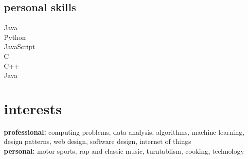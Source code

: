 \documentclass[]{friggeri-cv} %
\begin{document}
    \begin{minipage}[t]{0.5\linewidth}
    \begin{flushright}

    \section{personal skills} 
    \end{flushright}

\hfill
\begin{flushright}
Java\quad{\color{blue} $\varheartsuit\varheartsuit\varheartsuit\varheartsuit\varheartsuit\varheartsuit\varheartsuit\varheartsuit\varheartsuit\varheartsuit\varheartsuit\varheartsuit\varheartsuit\varheartsuit$}{\color{black} $\varheartsuit$} \\
Python\quad{\color{blue} $\varheartsuit\varheartsuit\varheartsuit\varheartsuit\varheartsuit\varheartsuit\varheartsuit\varheartsuit\varheartsuit\varheartsuit\varheartsuit\varheartsuit$}{\color{black} $\varheartsuit\varheartsuit\varheartsuit$} \\ 
JavaScript\quad{\color{blue} $\varheartsuit\varheartsuit\varheartsuit\varheartsuit\varheartsuit\varheartsuit\varheartsuit\varheartsuit\varheartsuit\varheartsuit\varheartsuit\varheartsuit\varheartsuit$}{\color{black} $\varheartsuit\varheartsuit$} \\ 
 C\quad{\color{blue} $\varheartsuit\varheartsuit\varheartsuit\varheartsuit\varheartsuit\varheartsuit\varheartsuit\varheartsuit\varheartsuit\varheartsuit\varheartsuit\varheartsuit\varheartsuit$}{\color{black} $\varheartsuit\varheartsuit$} \\
 C++\quad{\color{blue} $\varheartsuit\varheartsuit\varheartsuit\varheartsuit\varheartsuit\varheartsuit\varheartsuit\varheartsuit\varheartsuit\varheartsuit\varheartsuit\varheartsuit\varheartsuit$}{\color{black} $\varheartsuit\varheartsuit$} \\
 Java\quad{\color{blue} $\varheartsuit\varheartsuit\varheartsuit\varheartsuit\varheartsuit\varheartsuit\varheartsuit\varheartsuit\varheartsuit\varheartsuit\varheartsuit$}{\color{black} $\varheartsuit\varheartsuit\varheartsuit\varheartsuit$} \\

 \end{flushright}

\end{minipage}\par\bigskip


\section{interests}

\textbf{professional:} computing problems, data analysis, algorithms, machine learning, design patterns, web design, software design, internet of things \\
\textbf{personal:} motor sports, rap and classic music, turntablism, cooking, technology
\end{document}
